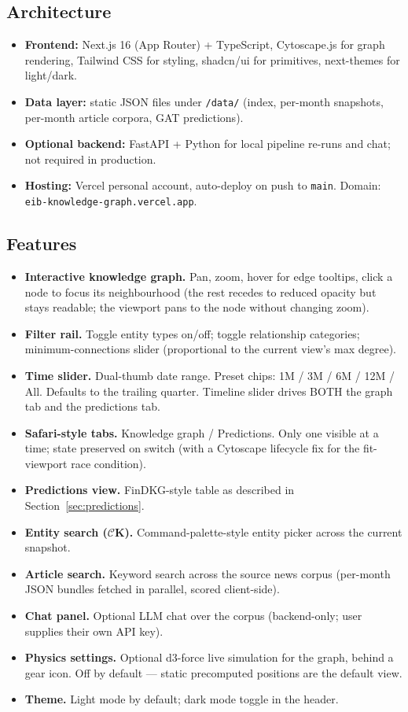 \documentclass[11pt]{article}
\begin{document}
\subsection{Architecture}
\begin{itemize}
  \item \textbf{Frontend:} Next.js 16 (App Router) + TypeScript, Cytoscape.js for graph rendering, Tailwind CSS for styling, shadcn/ui for primitives, next-themes for light/dark.
  \item \textbf{Data layer:} static JSON files under \texttt{/data/} (index, per-month snapshots, per-month article corpora, GAT predictions).
  \item \textbf{Optional backend:} FastAPI + Python for local pipeline re-runs and chat; not required in production.
  \item \textbf{Hosting:} Vercel personal account, auto-deploy on push to \texttt{main}. Domain: \texttt{eib-knowledge-graph.vercel.app}.
\end{itemize}

\subsection{Features}
\begin{itemize}
  \item \textbf{Interactive knowledge graph.} Pan, zoom, hover for edge tooltips, click a node to focus its neighbourhood (the rest recedes to reduced opacity but stays readable; the viewport pans to the node without changing zoom).
  \item \textbf{Filter rail.} Toggle entity types on/off; toggle relationship categories; minimum-connections slider (proportional to the current view's max degree).
  \item \textbf{Time slider.} Dual-thumb date range. Preset chips: 1M / 3M / 6M / 12M / All. Defaults to the trailing quarter. Timeline slider drives BOTH the graph tab and the predictions tab.
  \item \textbf{Safari-style tabs.} Knowledge graph / Predictions. Only one visible at a time; state preserved on switch (with a Cytoscape lifecycle fix for the fit-viewport race condition).
  \item \textbf{Predictions view.} FinDKG-style table as described in Section~\ref{sec:predictions}.
  \item \textbf{Entity search (\(\mathcal{C}\)K).} Command-palette-style entity picker across the current snapshot.
  \item \textbf{Article search.} Keyword search across the source news corpus (per-month JSON bundles fetched in parallel, scored client-side).
  \item \textbf{Chat panel.} Optional LLM chat over the corpus (backend-only; user supplies their own API key).
  \item \textbf{Physics settings.} Optional d3-force live simulation for the graph, behind a gear icon. Off by default --- static precomputed positions are the default view.
  \item \textbf{Theme.} Light mode by default; dark mode toggle in the header.
\end{itemize}
\end{document}
